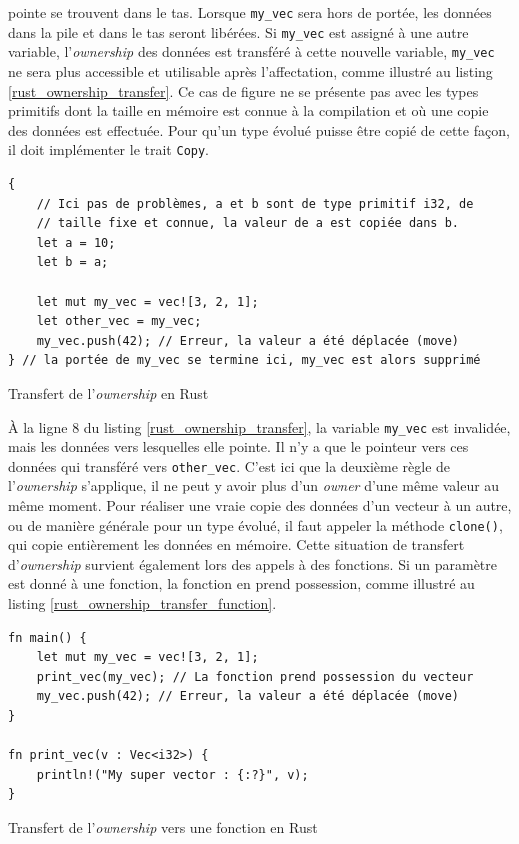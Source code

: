 \documentclass[a4paper, 12pt]{article}
\newenvironment{code}{\captionsetup{type=listing}}{}
\begin{document}
pointe se trouvent dans le tas. Lorsque \texttt{my_vec} sera hors de portée, les données 
dans la pile et dans le tas seront libérées. Si \texttt{my_vec} est assigné à une autre 
variable, l'\textit{ownership} des données est transféré à cette nouvelle variable, 
\texttt{my_vec} ne sera plus accessible et utilisable après l'affectation, comme illustré
au listing \ref{rust_ownership_transfer}. Ce cas de figure ne se présente pas avec les types primitifs 
dont la taille en mémoire est connue à la compilation et où une copie des données est effectuée. 
Pour qu'un type évolué puisse être copié de cette façon, il doit implémenter le trait \texttt{Copy}.
\bigbreak
\begin{code}
    \begin{verbatim}
{
    // Ici pas de problèmes, a et b sont de type primitif i32, de
    // taille fixe et connue, la valeur de a est copiée dans b.
    let a = 10;
    let b = a;

    let mut my_vec = vec![3, 2, 1]; 
    let other_vec = my_vec;
    my_vec.push(42); // Erreur, la valeur a été déplacée (move)
} // la portée de my_vec se termine ici, my_vec est alors supprimé
    \end{verbatim}
    \caption{Transfert de l'\textit{ownership} en Rust}
    \label{rust_ownership_transfer}
\end{code}
\bigbreak
À la ligne 8 du listing \ref{rust_ownership_transfer}, la variable \texttt{my_vec} est 
invalidée, mais les données vers lesquelles elle pointe. Il n'y a que le pointeur vers ces données 
qui transféré vers \texttt{other_vec}. C'est ici que la deuxième règle de l'\textit{ownership} 
s'applique, il ne peut y avoir plus d'un \textit{owner} d'une même valeur au même moment. 
Pour réaliser une vraie copie des données d'un vecteur à un autre, ou de manière générale pour un 
type évolué, il faut appeler la méthode \texttt{clone()}, qui copie entièrement les 
données en mémoire. Cette situation de transfert d'\textit{ownership} survient également lors des 
appels à des fonctions. Si un paramètre est donné à une fonction, la fonction en prend possession, 
comme illustré au listing \ref{rust_ownership_transfer_function}.
\bigbreak
\begin{code}
    \begin{verbatim}
fn main() {
    let mut my_vec = vec![3, 2, 1]; 
    print_vec(my_vec); // La fonction prend possession du vecteur
    my_vec.push(42); // Erreur, la valeur a été déplacée (move)
}

fn print_vec(v : Vec<i32>) {
    println!("My super vector : {:?}", v);
}
    \end{verbatim}
    \caption{Transfert de l'\textit{ownership} vers une fonction en Rust}
    \label{rust_ownership_transfer_function}
\end{code}
\end{document}
